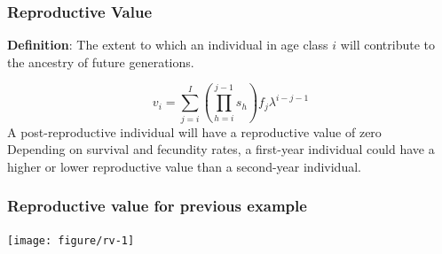 \documentclass[color=usenames,dvipsnames]{beamer}\usepackage[]{graphicx}\usepackage[]{color}
\begin{document}



\begin{frame}
  \frametitle{Reproductive Value}
  {\bf Definition}: The extent to which an individual in age class
  $i$ will contribute to the ancestry of future generations. \par
  \pause
  \[
    v_i = \sum_{j=i}^{I}\left(\prod_{h=i}^{j-1}s_h\right)f_j\lambda^{i-j-1}
  \]
  \pause
  \vfill
  A post-reproductive individual will have a reproductive value of zero \\
  \pause
  \vspace{1cm}
  Depending on survival and fecundity rates, a first-year individual
  could have a higher or lower reproductive value than a second-year
  individual. 
\end{frame}









\begin{frame}[fragile]
  \frametitle{Reproductive value for previous example}

\centering
\texttt{[image: figure/rv-1]} \\
\end{frame}
\end{document}
